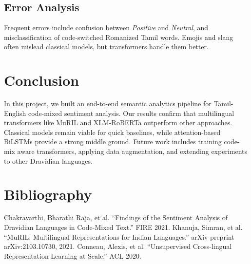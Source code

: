 \documentclass[12pt,a4paper]{article}
\begin{document}
\subsection{Error Analysis}
Frequent errors include confusion between \textit{Positive} and \textit{Neutral}, and misclassification of code-switched Romanized Tamil words. Emojis and slang often mislead classical models, but transformers handle them better.

\section{Conclusion}
In this project, we built an end-to-end semantic analytics pipeline for Tamil-English code-mixed sentiment analysis. Our results confirm that multilingual transformers like MuRIL and XLM-RoBERTa outperform other approaches. Classical models remain viable for quick baselines, while attention-based BiLSTMs provide a strong middle ground. Future work includes training code-mix aware transformers, applying data augmentation, and extending experiments to other Dravidian languages.

\clearpage
\section*{Bibliography}
\begin{thebibliography}{9}
Chakravarthi, Bharathi Raja, et al. ``Findings of the Sentiment Analysis of Dravidian Languages in Code-Mixed Text.'' FIRE 2021.
Khanuja, Simran, et al. ``MuRIL: Multilingual Representations for Indian Languages.'' arXiv preprint arXiv:2103.10730, 2021.
Conneau, Alexis, et al. ``Unsupervised Cross-lingual Representation Learning at Scale.'' ACL 2020.
\end{thebibliography}
\end{document}

